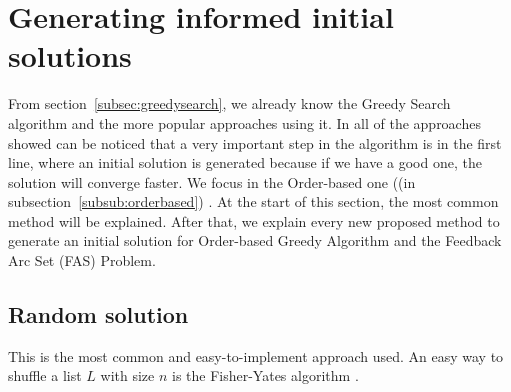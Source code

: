 \section{Generating informed initial solutions}
\label{sec:improve}

From section~\ref{subsec:greedysearch}, we already know the Greedy Search algorithm and the more popular approaches using it. In all of the approaches showed can be noticed that a very important step in the algorithm is in the first line, where an initial solution is generated because if we have a good one, the solution will converge faster. We focus in the Order-based one ((in subsection~\ref{subsub:orderbased}) . At the start of this section, the most common method will be explained. After that, we explain every new proposed method to generate an initial solution for Order-based Greedy Algorithm and the Feedback Arc Set (FAS) Problem.

\subsection{Random solution}
\label{subsec:randomapproach}
	This is the most common and easy-to-implement approach used. An easy way to shuffle a list $L$ with size $n$ is the Fisher-Yates algorithm \cite{FisherYates98}.

